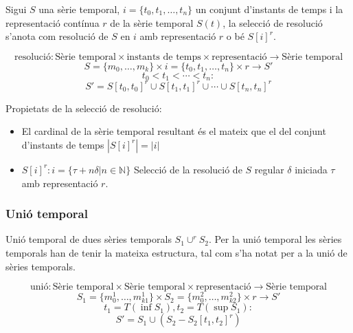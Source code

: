 Sigui $S$ una sèrie temporal, $i= \{t_0,t_1,\dotsc,t_n\}$ un conjunt
d'instants de temps i la representació contínua $r$ de la sèrie
temporal $S(t)$, la selecció de resolució s'anota com resolució de $S$
en $i$ amb representació $r$ o bé $S[i]^r$.

\begin{definition}
  \[
  \text{resolució}: \text{Sèrie temporal} \times \text{instants de
    temps} \times \text{representació} \longrightarrow \text{Sèrie
    temporal}
  \]
  \[
  S = \{m_0 , \ldots , m_k\} \times i = \{t_0,t_1,\dotsc,t_n\} \times r
  \longrightarrow S'
  \]
  \[
  t_0 < t_1 < \dotsb < t_n:
  \]
  \[
  S' = S[t_0,t_0]^r \cup  S[t_1,t_1]^r \cup \dotsb \cup S[t_{n},t_n]^r
  \] 
\end{definition}



Propietats de la selecció de resolució:
\begin{itemize}

\item El cardinal de la sèrie temporal resultant és el mateix que el del conjunt d'instants de temps $|S[i]^r| = |i|$

\item  $S[i]^r: i = \{\tau+n\delta | n\in\mathbb{N}\}$ Selecció de la resolució de $S$ regular $\delta$ iniciada $\tau$  amb representació $r$.
\end{itemize}







\subsubsection{Unió temporal}

Unió temporal de dues sèries temporals $S_1 \cup^r S_2$. Per la unió temporal les sèries temporals han de tenir la mateixa estructura, tal com s'ha notat per a la unió de sèries temporals.

\begin{definition}
  \[
  \text{unió}: \text{Sèrie temporal} \times \text{Sèrie temporal}
  \times \text{representació} \longrightarrow \text{Sèrie temporal}
  \]
  \[
  S_1 = \{m_0^1 , \ldots , m_{k1}^1\}  \times S_2 = \{m_0^2 , \ldots , m_{k2}^2\} \times r \longrightarrow S'
  \]
  \[
  t_1=T(\inf S_1), t_2=T(\sup S_1):
  \]
  \[
  S' = S_1 \cup  ( S_2 - S_2[t_1,t_2]^r )
  \] 
\end{definition}



